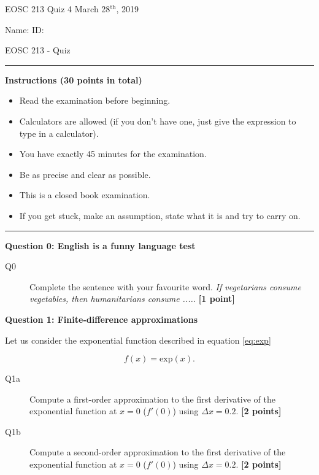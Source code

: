 \documentclass{article}
\begin{document}
\pagestyle{empty}

\large{EOSC 213 Quiz 4} \hspace{10cm} \large{March 28$^{\textrm{th}}$, 2019}

\large{Name:} \hspace{12cm} \large{ID: }
\begin{center}
\Huge{EOSC 213 - Quiz}
\end{center}

\rule{\textwidth}{1pt}

\large{\textbf{Instructions (30 points in total)}}
\begin{multicols}{2}
\begin{itemize}
\item Read the examination before beginning.
\item Calculators are allowed (if you don't have one, just give the expression to type in a calculator).
\item You have exactly 45 minutes for the examination.
\item Be as precise and clear as possible.
\item This is a closed book examination.
\item If you get stuck, make an assumption, state what it is and try to carry on.
\end{itemize} 
\end{multicols}



\rule{\textwidth}{1pt}

\textbf{Question 0: English is a funny language test}

\begin{description}
\item [Q0] Complete the sentence with your favourite word. \textit{If vegetarians consume vegetables, then humanitarians consume .....}  \textbf{[1 point]}
\vspace{0.5cm}

\end{description}

\textbf{Question 1: Finite-difference approximations}

Let us consider the exponential function described in equation \ref{eq:exp}

\begin{equation}
f(x) = \mathrm{exp}(x). \label{eq:exp}
\end{equation} 


\begin{description}
\item [Q1a] Compute a first-order approximation to the first derivative of the exponential function at $x = 0$ ($f'(0)$) using $\Delta x  = 0.2$.  \textbf{[2 points]}
\vspace{3cm}
\item [Q1b] Compute a second-order approximation to the first derivative of the exponential function at $x = 0$ ($f'(0)$) using $\Delta x  = 0.2$.  \textbf{[2 points]}
\vspace{3cm}

\end{description}
\end{document}
